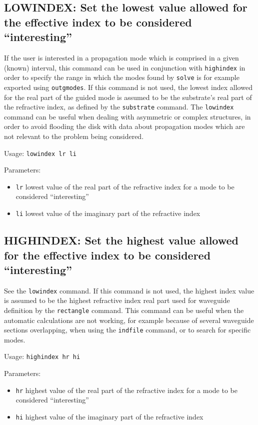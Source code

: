 \subsection{LOWINDEX: Set the lowest value allowed for the effective index to be
    considered ``interesting''}
\label{subsec_lowindex}
If the user is interested in a propagation mode which is comprised in a given (known) interval, this command can be used in conjunction with \lstinline!highindex! in order to specify the range in which the modes found by \lstinline!solve! is for example exported using \lstinline!outgmodes!.
If this command is not used, the lowest index allowed for the real part of the guided mode is assumed to be the substrate's real part of the refractive index, as defined by the \lstinline!substrate! command. The \lstinline!lowindex! command can be useful when dealing with asymmetric or complex structures, in order to avoid flooding the disk with data about propagation modes which are not relevant to the problem being considered.
    
    
    Usage: \lstinline!lowindex lr li!
    
    Parameters:
    \begin{itemize}
    \item \lstinline!lr! lowest value of the real part of the refractive index for a mode to be considered ``interesting''
    \item \lstinline!li! lowest value of the imaginary part of the refractive 
        index
    \end{itemize}

\subsection{HIGHINDEX: Set the highest value allowed for the effective index to be considered ``interesting''}
\label{subsec_highindex}
    See the \lstinline!lowindex! command. If this command is not used, the highest index value is assumed
    to be the highest refractive index real part used for waveguide definition
    by the \lstinline!rectangle! command. This  command can be useful when the automatic calculations are not working, for example because of several waveguide sections overlapping, when using the \lstinline!indfile! command, or to search for 
    specific modes.
    
    Usage: \lstinline!highindex hr hi!
    
    Parameters:
    \begin{itemize}
    \item \lstinline!hr! highest value of the real part of the refractive index for a mode to be considered ``interesting''
    \item \lstinline!hi! highest value of the imaginary part of the refractive
        index
    \end{itemize}
    



